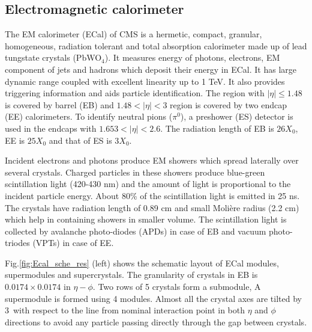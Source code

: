 \subsection{Electromagnetic calorimeter}
The EM calorimeter (ECal) of CMS is a hermetic, compact, granular, homogeneous, radiation tolerant and total absorption calorimeter made 
up of lead tungstate crystals (PbWO$_4$). It measures energy of photons, electrons, EM component of jets and hadrons which deposit their 
energy in ECal. It has large dynamic range 
coupled with excellent linearity up to 1 TeV. It also provides triggering information and aids particle identification. The region with 
$|\eta| \leq 1.48$ is covered by barrel (EB) and $1.48 < |\eta| < 3$ region is covered by two endcap (EE) calorimeters. To identify 
neutral pions ($\pi^0$), a preshower (ES) detector is used in the endcaps with $1.653 < |\eta| < 2.6$. The radiation length of EB is 
$26X_0$, EE is $25X_0$ and that of ES is $3X_0$.

Incident electrons and photons produce EM showers which spread laterally over several crystals. Charged particles in these showers produce 
blue-green scintillation light (420-430 nm) and the amount of light is proportional to the incident particle energy. About 80\% of the 
scintillation light is emitted in 25 ns. The crystals have radiation length of 0.89 cm and small Molière radius (2.2 cm) which help in 
containing showers in smaller volume. The scintillation light is collected by avalanche photo-diodes (APDs) in case of EB and vacuum 
photo-triodes (VPTs) in case of EE. 

Fig.\ref{fig:Ecal_sche_res} (left) shows the schematic layout of ECal modules, supermodules and supercrystals. The granularity of crystals 
in EB is $0.0174\times 0.0174$ in $\eta-\phi$. Two rows of 5 crystals form a submodule, A supermodule is formed using 4 modules. Almost 
all the crystal axes are tilted by 3\textdegree\ with respect to the line from nominal interaction point in both $\eta$ and $\phi$ 
directions to avoid any particle passing directly through the gap between crystals.

